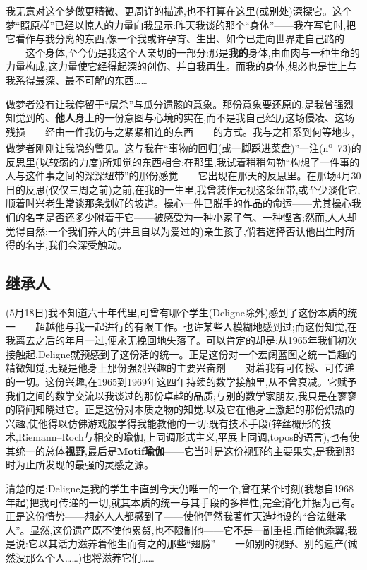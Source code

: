 我无意对这个梦做更精微、更周详的描述,也不打算在这里(或别处)深探它。这个梦“照原样”已经以惊人的力量向我显示:昨天我谈的那个“身体”——我在写它时,把它看作与我分离的东西,像一个我或许孕育、生出、如今已走向世界走自己路的——这个身体,至今仍是我这个人亲切的一部分:那是\textbf{我的}身体,由血肉与一种生命的力量构成,这力量使它经得起深的创伤、并自我再生。而我的身体,想必也是世上与我系得最深、最不可解的东西……

做梦者没有让我停留于“屠杀”与瓜分遗骸的意象。那份意象要还原的,是我曾强烈知觉到的、\textbf{他人}身上的一份意图与心境的实在,而不是我自己经历这场侵凌、这场残损——经由一件我仍与之紧紧相连的东西——的方式。我与之相系到何等地步,做梦者刚刚让我隐约瞥见。这与我在“事物的回归(或一脚踩进菜盘)”一注(n\textsuperscript{o}~73)的反思里(以较弱的力度)所知觉的东西相合:在那里,我试着稍稍勾勒“构想了一件事的人与这件事之间的深深纽带”的那份感觉——它出现在那天的反思里。在那场4月30日的反思(仅仅三周之前)之前,在我的一生里,我曾装作无视这条纽带,或至少淡化它,顺着时兴老生常谈那条划好的坡道。操心一件已脱手的作品的命运——尤其操心我们的名字是否还多少附着于它——被感受为一种小家子气、一种悭吝;然而,人人却觉得自然:一个我们养大的(并且自以为爱过的)亲生孩子,倘若选择否认他出生时所得的名字,我们会深受触动。

\subsection{继承人}


\dmark{}(5月18日)我不知道六十年代里,可曾有哪个学生(Deligne除外)感到了这份本质的统一——超越他与我一起进行的有限工作。也许某些人模糊地感到过;而这份知觉,在我离去之后的年月一过,便永无挽回地失落了。可以肯定的却是:从1965年我们初次接触起,Deligne就预感到了这份活的统一。正是这份对一个宏阔蓝图之统一旨趣的精微知觉,无疑是他身上那份强烈兴趣的主要兴奋剂——对着我有可传授、可传递的一切。这份兴趣,在1965到1969年这四年持续的数学接触里,从不曾衰减。它赋予我们之间的数学交流以我谈过的那份卓越的品质;与别的数学家朋友,我只是在寥寥的瞬间知晓过它。正是这份对本质之物的知觉,以及它在他身上激起的那份炽热的兴趣,使他得以仿佛游戏般学得我能教他的一切:既有技术手段(锌丝概形的技术,Riemann--Roch与相交的瑜伽,上同调形式主义,平展上同调,topos的语言),也有使其统一的总体\textbf{视野},最后是\textbf{Motif瑜伽}——它当时是这份视野的主要果实,是我到那时为止所发现的最强的灵感之源。

清楚的是:Deligne是我的学生中直到今天仍唯一的一个,曾在某个时刻(我想自1968年起)把我可传递的一切,就其本质的统一与其手段的多样性,完全消化并据为己有。正是这份情势——想必人人都感到了——使他俨然我著作天造地设的“合法继承人”。显然,这份遗产既不使他累赘,也不限制他——它不是一副重担,而给他添翼;我是说:它以其活力滋养着他生而有之的那些“翅膀”\dmark{}——一如别的视野、别的遗产(诚然没那么个人……)也将滋养它们……

